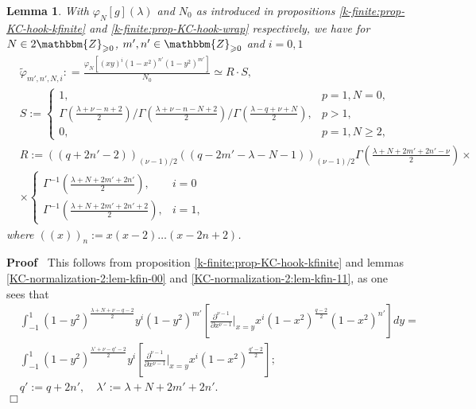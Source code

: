 \documentclass{article}
\newcommand{\assign}{:=}
\newenvironment{proof}{\noindent\textbf{Proof\ }}{\hspace*{\fill}$\Box$\medskip}
\numberwithin{definition}{section}
\newtheorem{lemma}{Lemma}
\numberwithin{lemma}{section}
\numberwithin{proposition}{section}
{\theorembodyfont{\rmfamily}\newtheorem{remark}{Remark}
\numberwithin{remark}{section}
}
\begin{document}
\begin{lemma}
  \label{KC-normalization-2:lem-kfinite}With $\varphi_N [ g] ( \lambda)$ and
  $N_0$ as introduced in propositions \ref{k-finite:prop-KC-hook-kfinite} and
  \ref{k-finite:prop-KC-hook-wrap} respectively, we have for $N \in
  2\mathbbm{Z}_{\geqslant 0}$, $m', n' \in \mathbbm{Z}_{\geqslant 0}$ and $i =
  0, 1$
  \begin{eqnarray*}
    & \tilde{\varphi}_{m', n', N, i} : = \frac{\varphi_N [ ( x y)^i ( 1 -
    x^2)^{n'} ( 1 - y^2)^{m'}]}{N_0} \simeq R \cdot S, & \\
    & S \assign \left\{ \begin{array}{ll}
      1, & p = 1, N = 0,\\
      \Gamma \left( \frac{\lambda + \nu - n + 2}{2} \right) / \Gamma \left(
      \frac{\lambda + \nu - n - N + 2}{2} \right) / \Gamma \left(
      \frac{\lambda - q + \nu + N}{2} \right), & p > 1,\\
      0, & p = 1, N \geqslant 2,
    \end{array} \right. & \\
    & R \assign ( ( q + 2 n' - 2))_{( \nu - 1) / 2} ( ( q - 2 m' - \lambda -
    N - 1))_{( \nu - 1) / 2} \Gamma \left( \frac{\lambda + N + 2 m' + 2 n' -
    \nu}{2} \right) \times & \\
    & \times \left\{ \begin{array}{ll}
      \Gamma^{- 1} \left( \frac{\lambda + N + 2 m' + 2 n'}{2} \right), & i =
      0\\
      \Gamma^{- 1} \left( \frac{\lambda + N + 2 m' + 2 n' + 2}{2} \right), & i
      = 1,
    \end{array} \right. & 
  \end{eqnarray*}
  where $( ( x))_n \assign x ( x - 2) \ldots ( x - 2 n + 2)$.
\end{lemma}

\begin{proof}
  This follows from proposition \ref{k-finite:prop-KC-hook-kfinite} and lemmas
  \ref{KC-normalization-2:lem-kfin-00} and
  \ref{KC-normalization-2:lem-kfin-11}, as one sees that
  \begin{eqnarray*}
    & \int_{- 1}^1 (1 - y^2)^{\frac{\lambda + N + \nu - q - 2}{2}} y^i  ( 1 -
    y^2)^{m'} \left[ \frac{\partial^{\nu - 1}}{\partial x^{\nu - 1}} |_{x = y}
    x^i (1 - x^2)^{\frac{q - 2}{2}}  ( 1 - x^2)^{n'} \right] dy = & \\
    & \int_{- 1}^1 (1 - y^2)^{\frac{\lambda' + \nu - q' - 2}{2}} y^i \left[
    \frac{\partial^{\nu - 1}}{\partial x^{\nu - 1}} |_{x = y} x^i (1 -
    x^2)^{\frac{q' - 2}{2}}  \right] ; & \\
    & q' \assign q + 2 n', \hspace{1em} \lambda' \assign \lambda + N + 2 m' +
    2 n' . & 
  \end{eqnarray*}
\end{proof}
\end{document}
